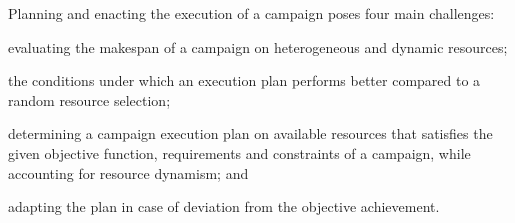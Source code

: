 

Planning and enacting the execution of a campaign poses four main challenges: 
\begin{inparaenum}[(i)]
\item evaluating the makespan of a campaign on heterogeneous and dynamic resources;
\item the conditions under which an execution plan performs better compared to a random resource selection;
\item determining a campaign execution plan on available resources that satisfies the given objective function, requirements and constraints of a campaign, while accounting for resource dynamism; and
\item adapting the plan in case of deviation from the objective achievement.
\end{inparaenum}

